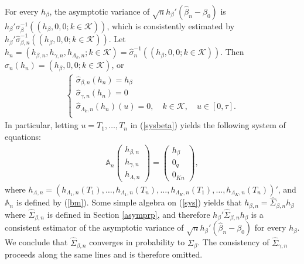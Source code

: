 \documentclass{statsoc}
\begin{document}
For every $h_\beta$, the asymptotic variance of $\sqrt n h_\beta'(\widehat\beta_n-\beta_0)$ is $h_\beta'\sigma_\beta^{-1} ((h_\beta,0, 0; k\in \mathcal K))$, which is consistently estimated by $h_\beta'\widehat \sigma_{\beta,n}^{-1} ((h_\beta, 0, 0; k\in \mathcal K))$. Let $h_n=(h_{\beta,n}, h_{\gamma,n}, h_{\Lambda_k,n}; k\in \mathcal K)=\widehat \sigma_n^{-1}((h_\beta,0, 0; k\in \mathcal K))$. Then $\widehat \sigma_n(h_n)=(h_\beta,0, 0; k\in \mathcal K)$, or
\begin{eqnarray}\label{sysbeta}
\left\{
\begin{array}{l}
\widehat \sigma_{\beta,n}(h_n)=h_\beta\\
\widehat \sigma_{\gamma,n}(h_n)=0\\
\widehat \sigma_{\Lambda_k,n}(h_n)(u)=0, \quad k\in\mathcal K, \quad u\in[0,\tau].\\
\end{array}\right.
\end{eqnarray}
In particular, letting $u=T_1,\ldots,T_n$ in (\ref{sysbeta}) yields the following system of equations:
\begin{eqnarray}\label{sys}
\mathbb A_n\left(
\begin{array}{c}
h_{\beta,n}\\
h_{\gamma,n}\\
h_{\Lambda,n}
\end{array}
\right)=\left(
\begin{array}{l}
h_\beta\\
0_q\\
0_{Kn}
\end{array}
\right),
\end{eqnarray}
where $h_{\Lambda,n}=(h_{\Lambda_1,n}(T_1), \ldots,h_{\Lambda_1,n}(T_n),\ldots, h_{\Lambda_K,n}(T_1), \ldots, h_{\Lambda_K,n}(T_n))'$, and $\mathbb A_n$ is defined by (\ref{bm}). Some simple algebra on (\ref{sys}) yields that $h_{\beta,n}=\widehat\Sigma_{\beta,n} h_\beta$ where $\widehat\Sigma_{\beta,n}$ is defined in Section \ref{asymprp}, and therefore $h_\beta' \widehat\Sigma_{\beta,n} h_\beta$ is a consistent estimator of the asymptotic variance of $\sqrt n h_\beta'(\widehat\beta_n-\beta_0)$ for every $h_\beta$. We conclude that $\widehat\Sigma_{\beta,n}$ converges in probability to $\Sigma_\beta$. The consistency of $\widehat\Sigma_{\gamma,n}$ proceeds along the same lines and is therefore omitted.
\end{document}

